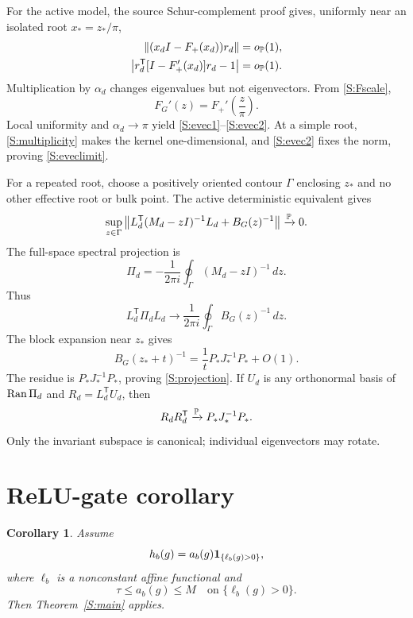 \documentclass[
  aps,
  prl,
  10pt,
  onecolumn,
  longbibliography,
  nofootinbib
]{revtex4-2}
\newtheorem{corollary}[theorem]{Corollary}
\theoremstyle{remark}
\begin{document}
For the active model, the source Schur-complement proof gives, uniformly near an isolated root $x_*=z_*/\pi$,
\begin{align}
\|(x_dI-F_+(x_d))r_d\|&=o_{\mathbb{P}}(1),\\
\left|r_d^{\mathsf T}[I-F_+'(x_d)]r_d-1\right|&=o_{\mathbb{P}}(1).
\end{align}
Multiplication by $\alpha_d$ changes eigenvalues but not eigenvectors. From \eqref{S:Fscale},
\begin{equation}
F_G'(z)=F_+'\!\left(\frac z\pi\right).
\end{equation}
Local uniformity and $\alpha_d\to\pi$ yield \eqref{S:evec1}--\eqref{S:evec2}. At a simple root, \eqref{S:multiplicity} makes the kernel one-dimensional, and \eqref{S:evec2} fixes the norm, proving \eqref{S:eveclimit}.

For a repeated root, choose a positively oriented contour $\Gamma$ enclosing $z_*$ and no other effective root or bulk point. The active deterministic equivalent gives
\begin{equation}
\sup_{z\in\Gamma}
\left\|
L_d^{\mathsf T}(M_d-zI)^{-1}L_d+B_G(z)^{-1}
\right\|
\xrightarrow{\mathbb{P}}0.
\label{S:resolvent}
\end{equation}
The full-space spectral projection is
\begin{equation}
\Pi_d=-\frac1{2\pi i}\oint_\Gamma(M_d-zI)^{-1}\,dz.
\end{equation}
Thus
\begin{equation}
L_d^{\mathsf T}\Pi_dL_d
\longrightarrow
\frac1{2\pi i}\oint_\Gamma B_G(z)^{-1}\,dz.
\end{equation}
The block expansion near $z_*$ gives
\begin{equation}
B_G(z_*+t)^{-1}
=
\frac1tP_*J_*^{-1}P_*+O(1).
\end{equation}
The residue is $P_*J_*^{-1}P_*$, proving \eqref{S:projection}. If $U_d$ is any orthonormal basis of $\operatorname{Ran}\Pi_d$ and $R_d=L_d^{\mathsf T}U_d$, then
\begin{equation}
R_dR_d^{\mathsf T}\xrightarrow{\mathbb{P}}P_*J_*^{-1}P_*.
\end{equation}
Only the invariant subspace is canonical; individual eigenvectors may rotate.

\section{ReLU-gate corollary}

\begin{corollary}
Assume
\begin{equation}
h_b(g)=a_b(g)\mathbf{1}_{\{\ell_b(g)>0\}},
\end{equation}
where $\ell_b$ is a nonconstant affine functional and
\begin{equation}
\tau\le a_b(g)\le M
\quad\text{on }\{\ell_b(g)>0\}.
\end{equation}
Then Theorem~\ref{S:main} applies.
\end{corollary}
\end{document}
